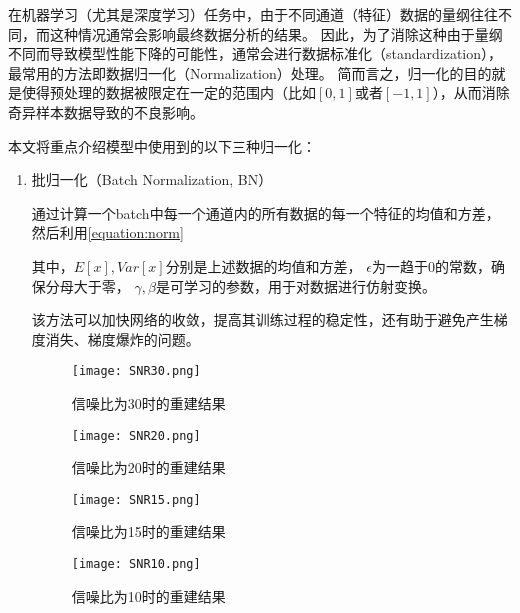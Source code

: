 在机器学习（尤其是深度学习）任务中，由于不同通道（特征）数据的量纲往往不同，而这种情况通常会影响最终数据分析的结果。
因此，为了消除这种由于量纲不同而导致模型性能下降的可能性，通常会进行数据标准化（standardization），最常用的方法即数据归一化（Normalization）处理。
简而言之，归一化的目的就是使得预处理的数据被限定在一定的范围内（比如$[0,1]$或者$[-1,1]$），从而消除奇异样本数据导致的不良影响。

本文将重点介绍模型中使用到的以下三种归一化：
\begin{enumerate}
  \item 批归一化（Batch Normalization, BN）

  
  通过计算一个batch中每一个通道内的所有数据的每一个特征的均值和方差，然后利用\cref{equation:norm}


其中，$E\left[ x\right], Var\left[ x\right]$分别是上述数据的均值和方差， $\epsilon$为一趋于0的常数，确保分母大于零，
$\gamma, \beta$是可学习的参数，用于对数据进行仿射变换。

该方法可以加快网络的收敛，提高其训练过程的稳定性，还有助于避免产生梯度消失、梯度爆炸的问题。


\begin{figure}[H]
    \centering
    \texttt{[image: SNR30.png]}
    \caption{信噪比为30时的重建结果}
    \label{figure:SNR30}
\end{figure}

\begin{figure}[H]
    \centering
    \texttt{[image: SNR20.png]}
    \caption{信噪比为20时的重建结果}
    \label{figure:SNR20}
\end{figure}

\begin{figure}[H]
    \centering
    \texttt{[image: SNR15.png]}
    \caption{信噪比为15时的重建结果}
    \label{figure:SNR30}
\end{figure}

\begin{figure}[H]
    \centering
    \texttt{[image: SNR10.png]}
    \caption{信噪比为10时的重建结果}
    \label{figure:SNR30}
\end{figure}






\end{enumerate}
